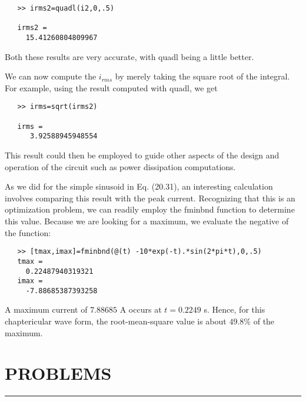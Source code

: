 \documentclass[../main.tex]{subfiles}
\begin{document}
\begin{verbatim}
   >> irms2=quadl(i2,0,.5)
   
   irms2 =
     15.41260804809967
\end{verbatim}
Both these results are very accurate, with quadl being a little better.

We can now compute the $i_{rms}$ by merely taking the square root of the integral. For example, using the result computed with quadl, we get

\begin{verbatim}
   >> irms=sqrt(irms2)
   
   irms =
      3.92588945948554
\end{verbatim}
This result could then be employed to guide other aspects of the design and operation of the
circuit such as power dissipation computations.

As we did for the simple sinusoid in Eq. (20.31), an interesting calculation involves
comparing this result with the peak current. Recognizing that this is an optimization problem, we can readily employ the fminbnd function to determine this value. Because we are
looking for a maximum, we evaluate the negative of the function:

\begin{verbatim}
   >> [tmax,imax]=fminbnd(@(t) -10*exp(-t).*sin(2*pi*t),0,.5)
   tmax =
     0.22487940319321
   imax =
     -7.88685387393258
\end{verbatim}
A maximum current of $7.88685$ A occurs at $t = 0.2249$ s. Hence, for this chaptericular wave
form, the root-mean-square value is about $49.8\%$ of the maximum.
\\
\section*{PROBLEMS} \hrule
\end{document}
